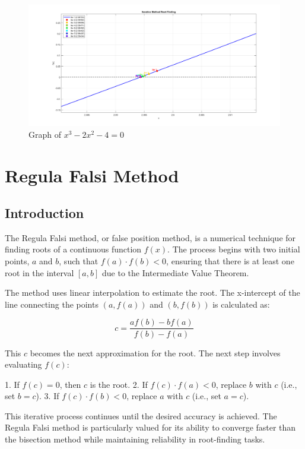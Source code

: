 \documentclass[12pt,a4paper]{article}
\begin{document}
	 
	
	 \begin{figure}[h]
	 	\centering
	 	\includegraphics[width=1.1\textwidth]{Iterative_ex02.png} %
	 	\caption{Graph of $x^3-2x^2-4=0$}
	 	\label{fig:your_label_here}
	 \end{figure} 
	 
	 
	
	\newpage
	\section{\centering Regula Falsi Method}
	
	\subsection{Introduction} \fontsize{18pt}{18pt}\selectfont
	The Regula Falsi method, or false position method, is a numerical technique for finding roots of a continuous function \(f(x)\). The process begins with two initial points, \(a\) and \(b\), such that \(f(a) \cdot f(b) < 0\), ensuring that there is at least one root in the interval \([a, b]\) due to the Intermediate Value Theorem.
	
	The method uses linear interpolation to estimate the root. The x-intercept of the line connecting the points \((a, f(a))\) and \((b, f(b))\) is calculated as:
	
	\[
	c = \frac{a f(b) - b f(a)}{f(b) - f(a)}
	\]
	
	This \(c\) becomes the next approximation for the root. The next step involves evaluating \(f(c)\):
	
	1. If \(f(c) = 0\), then \(c\) is the root.
	2. If \(f(c) \cdot f(a) < 0\), replace \(b\) with \(c\) (i.e., set \(b = c\)).
	3. If \(f(c) \cdot f(b) < 0\), replace \(a\) with \(c\) (i.e., set \(a = c\)).
	
	This iterative process continues until the desired accuracy is achieved. The Regula Falsi method is particularly valued for its ability to converge faster than the bisection method while maintaining reliability in root-finding tasks.
	
\end{document}
